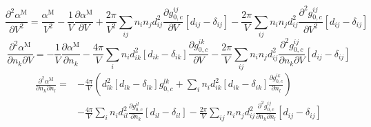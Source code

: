 \documentclass[english]{../thermomemo/thermomemo}
\begin{document}
\begin{equation}
\frac{\partial^2 \alpha^{\text{M}}}{\partial V^2}=\frac{\alpha^{\text{M}}}{V^2}-\frac{1}{V}\frac{\partial \alpha^\text{M}}{\partial V}+\frac{2\pi}{V^2}\sum_{ij}n_in_jd_{ij}^2\frac{\partial g_{0,c}^{ij}}{\partial V}\left[d_{ij}-\delta_{ij}\right]-\frac{2\pi}{V}\sum_{ij}n_in_jd_{ij}^2\frac{\partial^2 g_{0,c}^{ij}}{\partial V^2}\left[d_{ij}-\delta_{ij}\right]
\end{equation}
\begin{equation}
\frac{\partial^2 \alpha^{\text{M}}}{\partial n_k\partial V}=-\frac{1}{V}\frac{\partial \alpha^\text{M}}{\partial n_k}-\frac{4\pi}{V}\sum_{i}n_id_{ik}^2\left[d_{ik}-\delta_{ik}\right]\frac{\partial g_{0,c}^{ik}}{\partial V}-\frac{2\pi}{V}\sum_{ij}n_in_jd_{ij}^2\frac{\partial^2 g_{0,c}^{ij}}{\partial n_k\partial V}\left[d_{ij}-\delta_{ij}\right]
\end{equation}
\begin{equation}
\begin{split}
\frac{\partial^2 \alpha^{\text{M}}}{\partial n_k\partial n_l}=&-\frac{4\pi}{V}\left(d_{lk}^2\left[d_{lk}-\delta_{lk}\right]g_{0,c}^{lk}+\sum_{i}n_id_{ik}^2\left[d_{ik}-\delta_{ik}\right]\frac{\partial g_{0,c}^{ik}}{\partial n_l}\right) \\
&-\frac{4\pi}{V}\sum_{i}n_id_{il}^2\frac{\partial g_{0,c}^{il}}{\partial n_k}\left[d_{il}-\delta_{il}\right]-\frac{2\pi}{V}\sum_{ij}n_in_jd_{ij}^2\frac{\partial^2 g_{0,c}^{ij}}{\partial n_k\partial n_l}\left[d_{ij}-\delta_{ij}\right]
\end{split}
\end{equation}
\end{document}
